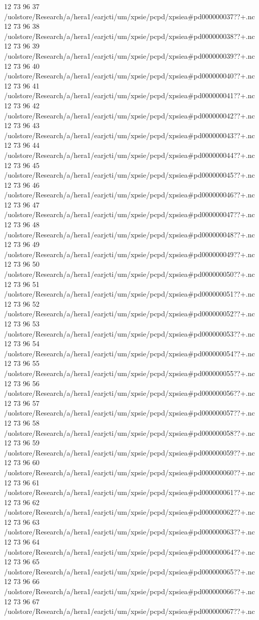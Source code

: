 12 73 96
37
/uolstore/Research/a/hera1/earjcti/um/xpsie/pcpd/xpsiea#pd000000037??+.nc
12 73 96
38
/uolstore/Research/a/hera1/earjcti/um/xpsie/pcpd/xpsiea#pd000000038??+.nc
12 73 96
39
/uolstore/Research/a/hera1/earjcti/um/xpsie/pcpd/xpsiea#pd000000039??+.nc
12 73 96
40
/uolstore/Research/a/hera1/earjcti/um/xpsie/pcpd/xpsiea#pd000000040??+.nc
12 73 96
41
/uolstore/Research/a/hera1/earjcti/um/xpsie/pcpd/xpsiea#pd000000041??+.nc
12 73 96
42
/uolstore/Research/a/hera1/earjcti/um/xpsie/pcpd/xpsiea#pd000000042??+.nc
12 73 96
43
/uolstore/Research/a/hera1/earjcti/um/xpsie/pcpd/xpsiea#pd000000043??+.nc
12 73 96
44
/uolstore/Research/a/hera1/earjcti/um/xpsie/pcpd/xpsiea#pd000000044??+.nc
12 73 96
45
/uolstore/Research/a/hera1/earjcti/um/xpsie/pcpd/xpsiea#pd000000045??+.nc
12 73 96
46
/uolstore/Research/a/hera1/earjcti/um/xpsie/pcpd/xpsiea#pd000000046??+.nc
12 73 96
47
/uolstore/Research/a/hera1/earjcti/um/xpsie/pcpd/xpsiea#pd000000047??+.nc
12 73 96
48
/uolstore/Research/a/hera1/earjcti/um/xpsie/pcpd/xpsiea#pd000000048??+.nc
12 73 96
49
/uolstore/Research/a/hera1/earjcti/um/xpsie/pcpd/xpsiea#pd000000049??+.nc
12 73 96
50
/uolstore/Research/a/hera1/earjcti/um/xpsie/pcpd/xpsiea#pd000000050??+.nc
12 73 96
51
/uolstore/Research/a/hera1/earjcti/um/xpsie/pcpd/xpsiea#pd000000051??+.nc
12 73 96
52
/uolstore/Research/a/hera1/earjcti/um/xpsie/pcpd/xpsiea#pd000000052??+.nc
12 73 96
53
/uolstore/Research/a/hera1/earjcti/um/xpsie/pcpd/xpsiea#pd000000053??+.nc
12 73 96
54
/uolstore/Research/a/hera1/earjcti/um/xpsie/pcpd/xpsiea#pd000000054??+.nc
12 73 96
55
/uolstore/Research/a/hera1/earjcti/um/xpsie/pcpd/xpsiea#pd000000055??+.nc
12 73 96
56
/uolstore/Research/a/hera1/earjcti/um/xpsie/pcpd/xpsiea#pd000000056??+.nc
12 73 96
57
/uolstore/Research/a/hera1/earjcti/um/xpsie/pcpd/xpsiea#pd000000057??+.nc
12 73 96
58
/uolstore/Research/a/hera1/earjcti/um/xpsie/pcpd/xpsiea#pd000000058??+.nc
12 73 96
59
/uolstore/Research/a/hera1/earjcti/um/xpsie/pcpd/xpsiea#pd000000059??+.nc
12 73 96
60
/uolstore/Research/a/hera1/earjcti/um/xpsie/pcpd/xpsiea#pd000000060??+.nc
12 73 96
61
/uolstore/Research/a/hera1/earjcti/um/xpsie/pcpd/xpsiea#pd000000061??+.nc
12 73 96
62
/uolstore/Research/a/hera1/earjcti/um/xpsie/pcpd/xpsiea#pd000000062??+.nc
12 73 96
63
/uolstore/Research/a/hera1/earjcti/um/xpsie/pcpd/xpsiea#pd000000063??+.nc
12 73 96
64
/uolstore/Research/a/hera1/earjcti/um/xpsie/pcpd/xpsiea#pd000000064??+.nc
12 73 96
65
/uolstore/Research/a/hera1/earjcti/um/xpsie/pcpd/xpsiea#pd000000065??+.nc
12 73 96
66
/uolstore/Research/a/hera1/earjcti/um/xpsie/pcpd/xpsiea#pd000000066??+.nc
12 73 96
67
/uolstore/Research/a/hera1/earjcti/um/xpsie/pcpd/xpsiea#pd000000067??+.nc

